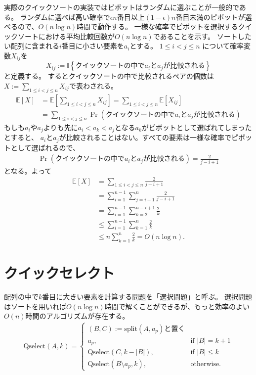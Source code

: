 \documentclass[a4paper,twoside,onecolumn,openany,article,10pt]{memoir}
\theoremstyle{remark}
\begin{document}
実際のクイックソートの実装ではピボットはランダムに選ぶことが一般的である。
ランダムに選べば高い確率で$\epsilon n$番目以上$(1-\epsilon) n$番目未満のピボットが選べるので、$O(n\log n)$時間で動作する。
一様な確率でピボットを選択するクイックソートにおける平均比較回数が$O(n\log n)$であることを示す。
ソートしたい配列に含まれる$i$番目に小さい要素を$a_i$とする。
$1\le i<j\le n$ について確率変数$X_{ij}$を
\begin{equation*}
X_{ij} := \mathbb{I}\left\{\text{クイックソートの中で$a_i$と$a_j$が比較される}\right\}
\end{equation*}
と定義する。
するとクイックソートの中で比較されるペアの個数は$X:=\sum_{1\le i<j\le n} X_{ij}$で表わされる。
\begin{align*}
\mathbb{E}[X] &=
\mathbb{E}\left[\sum_{1\le i<j\le n} X_{ij}\right]
=
\sum_{1\le i<j\le n} \mathbb{E}[X_{ij}]\\
&=
\sum_{1\le i<j\le n} \Pr\left(\text{クイックソートの中で$a_i$と$a_j$が比較される}\right)
\end{align*}
もしも$a_i$や$a_j$よりも先に$a_i < a_k < a_j$となる$a_k$がピボットとして選ばれてしまったとすると、
$a_i$と$a_j$が比較されることはない。すべての要素は一様な確率でピボットとして選ばれるので、
\begin{align*}
\Pr\left(\text{クイックソートの中で$a_i$と$a_j$が比較される}\right) = \frac2{j-i+1}
\end{align*}
となる。よって
\begin{align*}
\mathbb{E}[X] &=
\sum_{1\le i<j\le n} \frac2{j-i+1}\\
&= \sum_{i=1}^{n-1} \sum_{j=i+1}^n \frac2{j-i+1}\\
&= \sum_{i=1}^{n-1} \sum_{k=2}^{n-i+1} \frac2{k}\\
&\le \sum_{i=1}^{n-1} \sum_{k=1}^{n} \frac2{k}\\
&\le n\sum_{k=1}^{n} \frac2{k} = O(n\log n).
\end{align*}

\section{クイックセレクト}
配列の中で$k$番目に大きい要素を計算する問題を「選択問題」と呼ぶ。
選択問題はソートを用いれば$O(n\log n)$時間で解くことができるが、もっと効率のよい$O(n)$時間のアルゴリズムが存在する。
\begin{align*}
\mathrm{Qselect}(A, k) =
\begin{cases}
(B, C) := \mathrm{split}(A, a_p)\text{と置く}\\
a_p,& \text{if } |B| = k+1\\
\mathrm{Qselect}(C, k-|B|),&\text{if } |B| \le k\\
\mathrm{Qselect}(B\setminus a_p, k),&\text{otherwise.}
\end{cases}
\end{align*}
\end{document}
